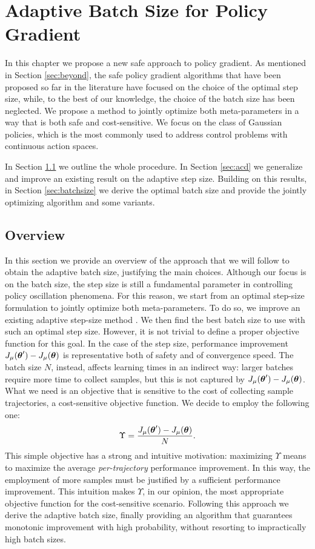 \chapter{Adaptive Batch Size for Policy Gradient}\label{chap:main}
In this chapter we propose a new safe approach to policy gradient. As mentioned in Section \ref{sec:beyond}, the safe policy gradient algorithms that have been proposed so far in the literature have focused on the choice of the optimal step size, while, to the best of our knowledge, the choice of the batch size has been neglected. We propose a method to jointly optimize both meta-parameters in a way that is both safe and cost-sensitive. We focus on the class of Gaussian policies, which is the most commonly used to address control problems with continuous action spaces.

In Section \ref{sec:main_overview} we outline the whole procedure. In Section \ref{sec:acd} we generalize and improve an existing result on the adaptive step size. Building on this results, in Section \ref{sec:batchsize} we derive the optimal batch size and provide the jointly optimizing algorithm and some variants.


\section{Overview}\label{sec:main_overview}
In this section we provide an overview of the approach that we will follow to obtain the adaptive batch size, justifying the main choices.
Although our focus is on the batch size, the step size is still a fundamental parameter in controlling policy oscillation phenomena. For this reason, we start from an optimal step-size formulation to jointly optimize both meta-parameters. To do so, we improve an existing adaptive step-size method \cite{NIPS2013_5186}. We then find the best batch size to use with such an optimal step size.
However, it is not trivial to define a proper objective function for this goal. In the case of the step size, performance improvement $J_{\mu}(\boldsymbol{\theta}') - J_{\mu}(\boldsymbol{\theta})$ is representative both of safety and of convergence speed. The batch size $N$, instead, affects learning times in an indirect way: larger batches require more time to collect samples, but this is not captured by $J_{\mu}(\boldsymbol{\theta}') - J_{\mu}(\boldsymbol{\theta})$. What we need is an objective that is sensitive to the cost of collecting sample trajectories, \ie a cost-sensitive objective function. We decide to employ the following one:
\[
	\Upsilon = \frac{J_{\mu}(\boldsymbol{\theta}') - J_{\mu}(\boldsymbol{\theta})}{N}.
\]
This simple objective has a strong and intuitive motivation: maximizing $\Upsilon$ means to maximize the average \textit{per-trajectory} performance improvement. In this way, the employment of more samples must be justified by a sufficient performance improvement. This intuition makes $\Upsilon$, in our opinion, the most appropriate objective function for the cost-sensitive scenario.
Following this approach we derive the adaptive batch size, finally providing an algorithm that guarantees monotonic improvement with high probability, without resorting to impractically high batch sizes.



